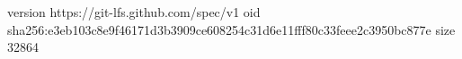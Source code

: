 version https://git-lfs.github.com/spec/v1
oid sha256:e3eb103c8e9f46171d3b3909ce608254c31d6e11fff80c33feee2c3950bc877e
size 32864
